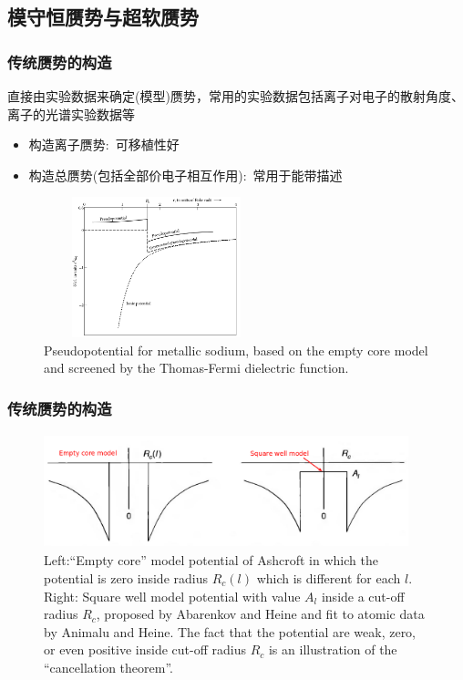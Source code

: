 \documentclass[cjk,slidestop,compress,mathserif,blue]{beamer}
\begin{document}
\subsection{模守恒赝势与超软赝势}
\frame
{
	\frametitle{传统赝势的构造}
	直接由实验数据来确定(模型)赝势，常用的实验数据包括离子对电子的散射角度、离子的光谱实验数据等
		\begin{itemize}
			\item 构造离子赝势:~可移植性好
			\item 构造总赝势(包括全部价电子相互作用):~常用于能带描述
		\end{itemize}
\begin{figure}[h!]
\centering
\vspace*{-0.10in}
\includegraphics[height=1.60in,width=2.57in,viewport=0 0 980 600,clip]{Figures/Pseudo-model-empty_core.png}
\caption{\tiny \textrm{Pseudopotential for metallic sodium, based on the empty core model and screened by the Thomas-Fermi dielectric function.}}%
\label{Pseudo_model-empty_core}
\end{figure}
}

\frame
{
	\frametitle{传统赝势的构造}
\begin{figure}[h!]
\centering
\vspace*{-0.10in}
\includegraphics[height=1.30in,width=4.17in,viewport=0 0 1150 350,clip]{Figures/Pseudo-model.png}
\caption{\tiny \textrm{Left:``Empty core'' model potential of Ashcroft in which the potential is zero inside radius $R_c(l)$ which is different for each $l$. Right: Square well model potential with value $A_l$ inside a cut-off radius $R_c$, proposed by Abarenkov and Heine and fit to atomic data by Animalu and Heine. The fact that the potential are weak, zero, or even positive inside cut-off radius $R_c$ is an illustration of the ``cancellation theorem''.}}%
\label{Pseudo-model}
\end{figure}
}
\end{document}
